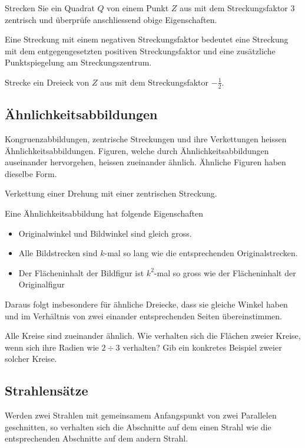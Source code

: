 \documentclass[%
11pt,%
twoside,%
titlepage,%
german,%
headsepline%
]{scrartcl}
\begin{document}
\begin{ueb}
Strecken Sie ein Quadrat $Q$ von einem Punkt $Z$ aus mit dem Streckungsfaktor $3$ zentrisch und \"uberpr\"ufe anschliessend obige Eigenschaften.%
\end{ueb}

\begin{ueb}
Eine Streckung mit einem negativen Streckungsfaktor bedeutet eine Streckung mit dem entgegengesetzten positiven Streckungsfaktor und eine zus\"atzliche Punktspiegelung am Streckungszentrum.

\noindent Strecke ein Dreieck von $Z$ aus mit dem Streckungsfaktor $-\frac{1}{2}$.
\end{ueb}

\subsection{\"Ahnlichkeitsabbildungen}
Kongruenzabbildungen, zentrische Streckungen und ihre Verkettungen heissen \"Ahnlichkeitsabbildungen. Figuren, welche durch \"Ahnlichkeitsabbildungen auseinander hervorgehen, heissen zueinander \"ahnlich. \"Ahnliche Figuren haben dieselbe Form.

\begin{bsp}
Verkettung einer Drehung mit einer zentrischen Streckung.%
\end{bsp}

Eine \"Ahnlichkeitsabbildung hat folgende Eigenschaften
\begin{itemize}
\item Originalwinkel und Bildwinkel sind gleich gross.
\item Alle Bildstrecken sind $k$-mal so lang wie die entsprechenden Originalstrecken.
\item Der Fl\"acheninhalt der Bildfigur ist $k^2$-mal so gross wie der Fl\"acheninhalt der Originalfigur
\end{itemize}
Daraus folgt insbesondere f\"ur \"ahnliche Dreiecke, dass sie gleiche Winkel haben und im Verh\"altnis von zwei einander entsprechenden Seiten \"ubereinstimmen.

\begin{ueb}
Alle Kreise sind zueinander \"ahnlich. Wie verhalten sich die Fl\"achen zweier Kreise, wenn sich ihre Radien wie $2\div3$ verhalten? Gib ein konkretes Beispiel zweier solcher Kreise.
\end{ueb}

\subsection{Strahlens\"atze}
\begin{csatz}[1. Strahlensatz]{}
Werden zwei Strahlen mit gemeinsamem Anfangspunkt von zwei Parallelen geschnitten, so verhalten sich die Abschnitte auf dem einen Strahl wie die entsprechenden Abschnitte auf dem andern Strahl.%
\end{csatz}
\end{document}
